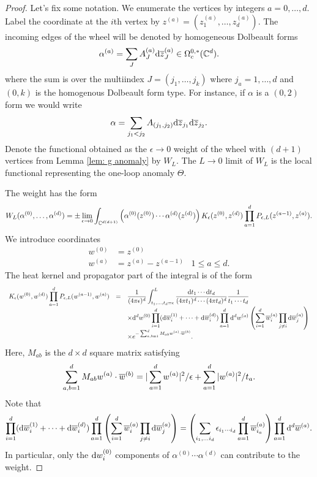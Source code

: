 \documentclass[10pt]{amsart}
\begin{document}
\begin{proof}

Let's fix some notation. 
We enumerate the vertices by integers $a = 0,\ldots, d$. 
Label the coordinate at the $i$th vertex by $z^{(a)} = (z_1^{(a)}, \ldots, z_d^{(a)})$. 
The incoming edges of the wheel will be denoted by homogeneous Dolbeault forms 
\[
\alpha^{(a)} = \sum_{J} A^{(a)}_J \d \zbar_J^{(a)} \in \Omega_c^{0,*}(\CC^d) .
\]
where the sum is over the multiindex $J = (j_1,\ldots, j_k)$ where $j_a = 1,\ldots, d$ and $(0,k)$ is the homogenous Dolbeault form type. 
For instance, if $\alpha$ is a $(0,2)$ form we would write
\[
\alpha = \sum_{j_1 < j_2} A_{(j_1,j_2)} \d \zbar_{j_1} \d\zbar_{j_2} .
\]
Denote the functional obtained as the $\epsilon \to 0$ weight of the wheel with $(d+1)$ vertices from Lemma \ref{lem: g anomaly} by $W_L$.
The $L\to 0$ limit of $W_L$ is the local functional representing the one-loop anomaly $\Theta$. 

The weight has the form
\[
W_L(\alpha^{(0)},\ldots,\alpha^{(d)}) = \pm \lim_{\epsilon \to 0} \int_{\CC^{d(d+1)}} \left(\alpha^{(0)}(z^{(0)}) \cdots \alpha^{(d)}(z^{(d)}) \right) K_\epsilon(z^{(0)},z^{(d)}) \prod_{a =1}^d P_{\epsilon,L} (z^{(a-1)}, z^{(a)}) .
\]
We introduce coordinates
\begin{align*}
w^{(0)} & = z^{(0)} \\
w^{(a)} & = z^{(a)} - z^{(a-1)} \;\;\; 1 \leq a \leq d .
\end{align*}
The heat kernel and propagator part of the integral is of the form
\[
\begin{array}{ccl}
\displaystyle
K_\epsilon(w^{(0)},w^{(d)}) \prod_{a =1}^d P_{\epsilon,L} (w^{(a-1)}, w^{(a)}) & = & \displaystyle \frac{1}{(4 \pi \epsilon)^d} \int_{t_1,\ldots,t_d = \epsilon}^L \frac{\d t_1 \cdots \d t_d}{(4 \pi t_1)^d \cdots (4 \pi t_d)^d} \frac{1}{t_1\cdots t_d}  \\ & & \displaystyle \times \d^d w^{(0)} \prod_{i=1}^d (\d \Bar{w}^{(1)}_i + \cdots + \d \Bar{w}^{(d)}_i) \prod_{a = 1}^d \d^d w^{(a)} \left(\sum_{i = 1}^d \Bar{w}_i^{(a)} \prod_{j \ne i} \d \Bar{w}_{j}^{(a)}\right)
\\ & & \displaystyle \times e^{-\sum_{a,b = 1}^d M_{a b} w^{(a)} \cdot \Bar{w}^{(b)}} .
\end{array}
\]
Here, $M_{ab}$ is the $d \times d$ square matrix satisfying
\[
\sum_{a,b = 1}^d M_{a b} w^{(a)} \cdot \Bar{w}^{(b)} = |\sum_{a = 1}^d w^{(a)} |^2 / \epsilon + \sum_{a = 1}^d |w^{(a)}|^2 / t_a .
\]
Note that
\[
\prod_{i=1}^d (\d \Bar{w}^{(1)}_i + \cdots + \d \Bar{w}^{(d)}_i) \prod_{a = 1}^d \left(\sum_{i = 1}^d \Bar{w}_i^{(a)} \prod_{j \ne i} \d \Bar{w}_{j}^{(a)}\right) = \left( \sum_{i_1,\ldots i_d} \epsilon_{i_1\cdots i_d} \prod_{a=1}^d \Bar{w}^{(a)}_{i_a}\right) \prod_{a=1}^d \d^d \Bar{w}^{(a)} .
\]
In particular, only the $\d w_i^{(0)}$ components of $\alpha^{(0)} \cdots \alpha^{(d)}$ can contribute to the weight.


\end{proof}
\end{document}
